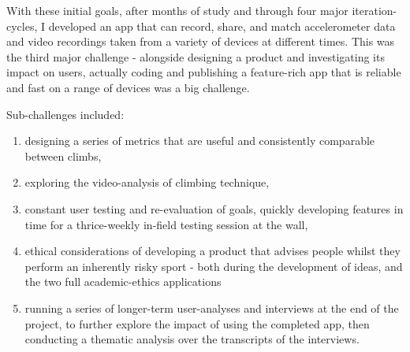 With these initial goals, after months of study and through four major iteration-cycles, I developed an app that can record, share, and match accelerometer data and video recordings taken from a variety of devices at different times.
This was the third major challenge - alongside designing a product and investigating its impact on users, actually coding and publishing a feature-rich app that is reliable and fast on a range of devices was a big challenge.


Sub-challenges included:
\begin{enumerate}
\item designing a series of metrics that are useful and consistently comparable between climbs, \item exploring the video-analysis of climbing technique,
\item constant user testing and re-evaluation of goals, quickly developing features in time for a thrice-weekly in-field testing session at the wall,
\item ethical considerations of developing a product that advises people whilst they perform an inherently risky sport - both during the development of ideas, and the two full academic-ethics applications
\item running a series of longer-term user-analyses and interviews at the end of the project, to further explore the impact of using the completed app, then conducting a thematic analysis over the transcripts of the interviews.
\end{enumerate}
